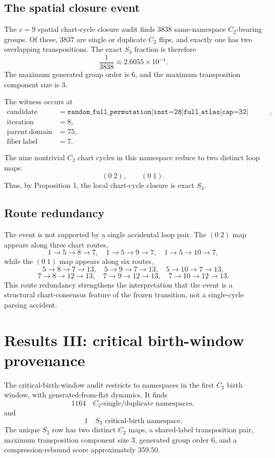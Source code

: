 \documentclass[11pt]{article}
\begin{document}
\subsection{The spatial closure event}

The $v=9$ spatial chart-cycle closure audit finds $3838$ same-namespace $C_2$-bearing groups.  Of these, $3837$ are single or duplicate $C_2$ flips, and exactly one has two overlapping transpositions.  The exact $S_3$ fraction is therefore
\[
\frac{1}{3838}\approx 2.6055\times 10^{-4}.
\]
The maximum generated group order is $6$, and the maximum transposition component size is $3$.

The witness occurs at
\begin{align*}
\mathrm{candidate} &= \texttt{random\_full\_permutation|inst=28|full\_atlas|cap=32|seed=3221741},\\
\mathrm{iteration} &= 8,\\
\mathrm{parent\ domain} &= 75,\\
\mathrm{fiber\ label} &= 7.
\end{align*}

The nine nontrivial $C_2$ chart cycles in this namespace reduce to two distinct loop maps:
\[
(0\;2),\qquad (0\;1).
\]
Thus, by Proposition 1, the local chart-cycle closure is exact $S_3$.

\subsection{Route redundancy}

The event is not supported by a single accidental loop pair.  The $(0\;2)$ map appears along three chart routes,
\[
1\to 5\to 8\to 7,
\quad
1\to 5\to 9\to 7,
\quad
1\to 5\to 10\to 7,
\]
while the $(0\;1)$ map appears along six routes,
\[
5\to 8\to 7\to 13,
\quad
5\to 9\to 7\to 13,
\quad
5\to 10\to 7\to 13,
\]
\[
7\to 8\to 12\to 13,
\quad
7\to 9\to 12\to 13,
\quad
7\to 10\to 12\to 13.
\]
This route redundancy strengthens the interpretation that the event is a structural chart-consensus feature of the frozen transition, not a single-cycle parsing accident.

\section{Results III: critical birth-window provenance}

The critical-birth-window audit restricts to namespaces in the first $C_2$ birth window, with generated-from-flat dynamics.  It finds
\[
1164\quad C_2\text{-single/duplicate namespaces},
\]
and
\[
1\quad S_3\text{ critical-birth namespace}.
\]
The unique $S_3$ row has two distinct $C_2$ maps, a shared-label transposition pair, maximum transposition component size $3$, generated group order $6$, and a compression-rebound score approximately $359.50$.
\end{document}
